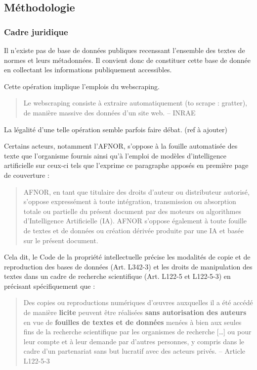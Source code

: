\documentclass[a4paper,12pt]{article}
\begin{document}
\subsection{Méthodologie}
\label{sec:orgf8b9d19}
\subsubsection{Cadre juridique}
\label{sec:orgecb0ed0}
Il n'existe pas de base de données publiques recenssant l'ensemble des textes de normes et leurs métadonnées. Il convient donc de constituer cette base de donnée en collectant les informations publiquement accessibles.

Cette opération implique l'emplois du webscraping.

\begin{quote}
Le webscraping consiste à extraire automatiquement (to scrape : gratter), de manière massive des données d'un site web. -- INRAE\autocite{quesnevilleRecommandationsUsagesWebscraping2024}
\end{quote}

La légalité d'une telle opération semble parfois faire débat. (ref à ajouter)

Certains acteurs, notamment l'AFNOR, s'oppose à la fouille automatisée des texte que l'organisme fournis ainsi qu'à l'emploi de modèles d'intelligence artificielle sur ceux-ci tels que l'exprime ce paragraphe apposés en première page de couverture :
\begin{quote}
AFNOR, en tant que titulaire des droits d’auteur ou distributeur autorisé, s’oppose expressément à toute intégration, transmission ou absorption totale ou partielle du présent document par des moteurs ou algorithmes d’Intelligence Artificielle (IA). AFNOR s’oppose également à toute fouille de textes et de données ou création dérivée produite par une IA et basée sur le présent document.
\end{quote}

Cela dit, le Code de la propriété intellectuelle précise les modalités de copie et de reproduction des bases de données (Art. L342-3) et les droits de manipulation des textes dans un cadre de recherche scientifique (Art. L122-5 et L122-5-3)\autocite{CodeProprieteIntellectuelle} en précisant spécifiquement que :
\begin{quote}
Des copies ou reproductions numériques d'œuvres auxquelles il a été accédé de manière \textbf{licite} peuvent être réalisées \textbf{sans autorisation des auteurs} en vue de \textbf{fouilles de textes et de données} menées à bien aux seules fins de la recherche scientifique par les organismes de recherche [\ldots{}] ou pour leur compte et à leur demande par d'autres personnes, y compris dans le cadre d'un partenariat sans but lucratif avec des acteurs privés. -- Article L122-5-3\autocite{CodeProprieteIntellectuelle}
\end{quote}
\end{document}
